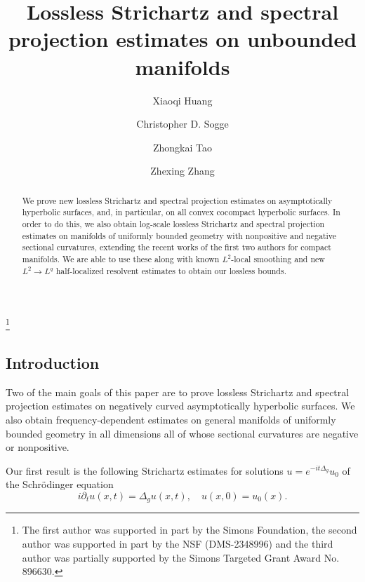 \documentclass[10pt]{amsart}
\newcommand{\newsection}[1]
{\subsection{#1}\setcounter{theorem}{0} \setcounter{equation}{0}
\par\noindent}
\newcommand{\1}{{\bf 1}}
\begin{document}
\title[Lossless Strichartz and spectral projection estimates]
{Lossless Strichartz and spectral projection estimates on unbounded manifolds}
\thanks{The first author was supported in part by the Simons Foundation, the second author was  supported in part by the NSF (DMS-2348996)
and the third author was partially supported by the Simons Targeted Grant Award No. 896630.}
%
%
%
%
%
%
\author{Xiaoqi Huang}
\author{Christopher D. Sogge}
\author{Zhongkai Tao}
\author{Zhexing Zhang}
\address{XH: Department of Mathematics, Louisiana State University, Baton Rouge, LA 70803}
\address{CDS and ZZ: Department of Mathematics,  Johns Hopkins University,
Baltimore, MD 21218}
\address{ZT: Institut des Hautes \'Etudes Scientifiques, 91440 Bures-sur-Yvette, France}


\begin{abstract}
We prove new lossless Strichartz and spectral projection estimates on asymptotically hyperbolic surfaces,
and, in particular, on all convex cocompact hyperbolic surfaces.
In order to do this, we also obtain log-scale lossless Strichartz and spectral projection estimates on manifolds
of uniformly bounded geometry
with nonpositive and negative sectional curvatures, extending the recent works of the first two authors 
for compact manifolds.  
We
are able to use these along with 
  known $L^2$-local smoothing and new 
$L^2 \to L^q$ half-localized resolvent
estimates to obtain our lossless bounds.
\end{abstract}


\maketitle




\newsection{Introduction}








Two of the main goals of this paper are to prove lossless Strichartz and spectral projection estimates
on negatively curved asymptotically hyperbolic surfaces.
We also obtain frequency-dependent estimates on general manifolds of uniformly bounded geometry in all
dimensions all of whose sectional curvatures are negative or nonpositive.



Our first result is the following Strichartz estimates for solutions $u=e^{-it\Delta_g}u_0$ of the 
Schr\"odinger equation
\begin{equation}\label{ii.0}
i\partial_t u(x,t)=\Delta_g u(x,t), \quad u(x,0)=u_0(x).
\end{equation}
\end{document}
